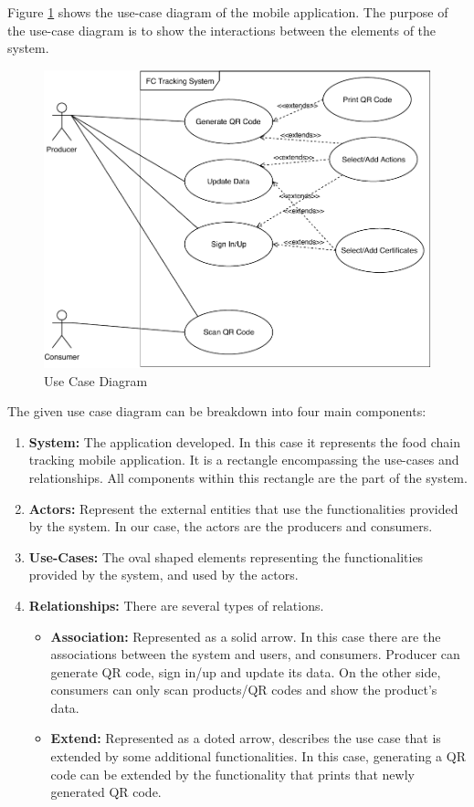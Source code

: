 Figure \ref{fig:use_case_digram} shows the use-case diagram of the mobile application. The purpose of the use-case diagram is to show the interactions between the elements of the system.



\begin{figure}[ht]
\centering
\includegraphics[width=0.7\columnwidth]{figures/use-case-diagram.pdf}
\caption{Use Case Diagram}
\label{fig:use_case_digram}
\end{figure}

 The given use case diagram can be breakdown into four main components: 
 
 \begin{enumerate}
     \item \textbf{System:} The application developed. In this case it represents the food chain tracking mobile application. It is a rectangle encompassing the use-cases and relationships. All components within this rectangle are the part of the system.
     
     \item \textbf{Actors:} Represent the external entities that use the functionalities provided by the system. In our case, the actors are the producers and consumers. 
     
     \item \textbf{Use-Cases:} The oval shaped elements representing the functionalities provided by the system, and used by the actors.
     
     \item \textbf{Relationships:} There are several types of relations.
        \begin{itemize}
            \item \textbf{Association:} Represented as a solid arrow. In this case there are the associations between the system and users, and consumers. Producer can generate QR code, sign in/up and update its data. On the other side, consumers can only scan products/QR codes and show the product's data. 
            \item \textbf{Extend:} Represented as a doted arrow, describes the use case that is extended by some additional functionalities. In this case, generating a QR code can be extended by the functionality that prints that newly generated QR code. 
        \end{itemize}
 \end{enumerate}
 

